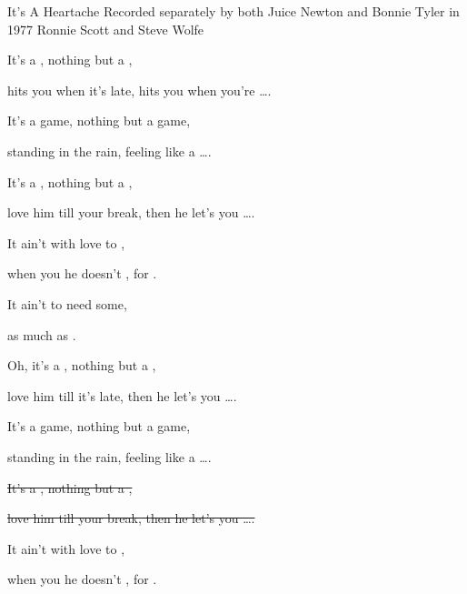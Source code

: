 \begin{SBSong}{It's A Heartache}
  {Recorded separately by both Juice Newton and Bonnie Tyler in 1977}
  {Ronnie Scott and Steve Wolfe}
  \begin{SBVerse}
    It's a , nothing but a ,

    hits you when it's  late, hits you when you're \ldots{}.

    It's a  game, nothing but a  game,

    standing in the  rain, feeling like a \ldots{}.
  \end{SBVerse}
  \begin{SBVerse}
    It's a , nothing but a ,

    love him till your  break, then he let's you \ldots{}.

    It ain't  with love to , 

    when you  he doesn't , for .
        
    It ain't  to need some, 

    as much as   \quad {}.
  \end{SBVerse}
  \begin{SBVerse}
    Oh, it's a , nothing but a ,

    love him till it's  late, then he let's you \ldots{}.

    It's a  game, nothing but a  game,

    standing in the  rain, feeling like a \ldots{}.
  \end{SBVerse}
  \begin{SBVerse}
  
    \sout{It's a , nothing but a ,}

    \sout{love him till your  break, then he let's you \ldots{}.}

    It ain't  with love to , 

    when you  he doesn't , for .
        

\end{SBVerse}
\end{SBSong}
